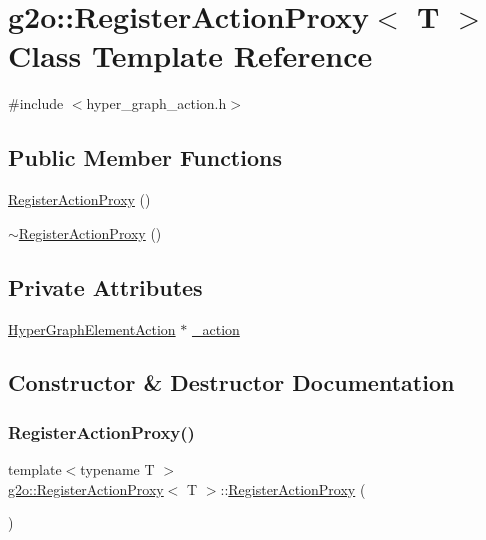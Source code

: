 \hypertarget{classg2o_1_1_register_action_proxy}{}\section{g2o\+:\+:Register\+Action\+Proxy$<$ T $>$ Class Template Reference}
\label{classg2o_1_1_register_action_proxy}


{\ttfamily \#include $<$hyper\+\_\+graph\+\_\+action.\+h$>$}

\subsection*{Public Member Functions}
\begin{DoxyCompactItemize}
\item 
\mbox{\hyperlink{classg2o_1_1_register_action_proxy_a2998e33a5b4627b38b58a493c16d65e6}{Register\+Action\+Proxy}} ()
\item 
\mbox{\hyperlink{classg2o_1_1_register_action_proxy_a73e8eacc965c3e9bb2084570c6b67eed}{$\sim$\+Register\+Action\+Proxy}} ()
\end{DoxyCompactItemize}
\subsection*{Private Attributes}
\begin{DoxyCompactItemize}
\item 
\mbox{\hyperlink{classg2o_1_1_hyper_graph_element_action}{Hyper\+Graph\+Element\+Action}} $\ast$ \mbox{\hyperlink{classg2o_1_1_register_action_proxy_abab95a1b707467ceebfe1448e40202b8}{\+\_\+action}}
\end{DoxyCompactItemize}


\subsection{Constructor \& Destructor Documentation}
\mbox{\label{classg2o_1_1_register_action_proxy_a2998e33a5b4627b38b58a493c16d65e6}} 
\subsubsection{\texorpdfstring{Register\+Action\+Proxy()}{RegisterActionProxy()}}
{\footnotesize\ttfamily template$<$typename T $>$ \\
\mbox{\hyperlink{classg2o_1_1_register_action_proxy}{g2o\+::\+Register\+Action\+Proxy}}$<$ T $>$\+::\mbox{\hyperlink{classg2o_1_1_register_action_proxy}{Register\+Action\+Proxy}} (\begin{DoxyParamCaption}{ }\end{DoxyParamCaption})\hspace{0.3cm}{\ttfamily [inline]}}

